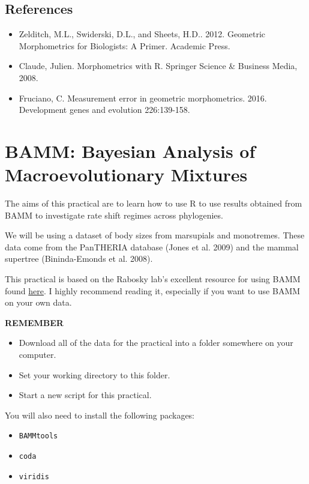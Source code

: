 \documentclass[]{book}
\providecommand{\tightlist}{%
  \setlength{\itemsep}{0pt}\setlength{\parskip}{0pt}}
\theoremstyle{definition}
\theoremstyle{definition}
\theoremstyle{definition}
\theoremstyle{remark}
\begin{document}
\section{References}\label{references-4}

\begin{itemize}
\tightlist
\item
  Zelditch, M.L., Swiderski, D.L., and Sheets, H.D.. 2012. Geometric
  Morphometrics for Biologists: A Primer. Academic Press.
\item
  Claude, Julien. Morphometrics with R. Springer Science \& Business
  Media, 2008.
\item
  Fruciano, C. Measurement error in geometric morphometrics. 2016.
  Development genes and evolution 226:139-158.
\end{itemize}

\chapter{BAMM: Bayesian Analysis of Macroevolutionary
Mixtures}\label{bamm-bayesian-analysis-of-macroevolutionary-mixtures}

The aims of this practical are to learn how to use R to use results
obtained from BAMM to investigate rate shift regimes across phylogenies.

We will be using a dataset of body sizes from marsupials and monotremes.
These data come from the PanTHERIA database (Jones et al. 2009) and the
mammal supertree (Bininda-Emonds et al. 2008).

This practical is based on the Rabosky lab's excellent resource for
using BAMM found \href{http://bamm-project.org/index.html}{here}. I
highly recommend reading it, especially if you want to use BAMM on your
own data.

\textbf{REMEMBER}

\begin{itemize}
\tightlist
\item
  Download all of the data for the practical into a folder somewhere on
  your computer.
\item
  Set your working directory to this folder.
\item
  Start a new script for this practical.
\end{itemize}

You will also need to install the following packages:

\begin{itemize}
\tightlist
\item
  \texttt{BAMMtools}
\item
  \texttt{coda}
\item
  \texttt{viridis}
\end{itemize}
\end{document}

